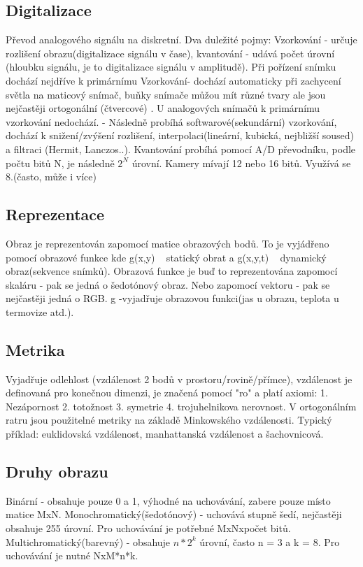 \subsection{Digitalizace}
Převod analogového signálu na diskretní. Dva duležité pojmy: Vzorkování - určuje rozlišení obrazu(digitalizace signálu v čase), kvantování
- udává počet úrovní (hloubku signálu, je to digitalizace signálu v amplitudě). Při pořízení snímku dochází nejdříve k primárnímu Vzorkování-
dochází automaticky při zachycení světla na maticový snímač, buňky snímače můžou mít různé tvary ale jsou nejčastěji ortogonální (čtvercové)
. U analogových snímačů k primárnímu vzorkování nedochází. - Následně probíhá softwarové(sekundární) vzorkování, dochází k snižení/zvýšení 
rozlišení, interpolaci(lineární, kubická, nejbližší soused) a filtraci (Hermit, Lanczos..). Kvantování probíhá pomocí A/D převodníku, podle 
počtu bitů N, je následně $2^N$ úrovní. Kamery mívají 12 nebo 16 bitů. Využívá se 8.(často, může i více)

\subsection{Reprezentace}
Obraz je reprezentován zapomocí matice obrazových bodů. To je vyjádřeno pomocí obrazové funkce kde g(x,y) ~ statický obrat a g(x,y,t) ~
dynamický obraz(sekvence snímků). Obrazová funkce je buď to reprezentována zapomocí skaláru - pak se jedná o šedotónový obraz. 
Nebo zapomocí vektoru - pak se nejčastěji jedná o RGB. g -vyjadřuje obrazovou funkci(jas u obrazu, teplota u termovize atd.). 
\subsection{Metrika}
Vyjadřuje odlehlost (vzdálenost 2 bodů v prostoru/rovině/přímce), vzdálenost je definovaná pro konečnou dimenzi, je značená pomocí "ro"
a platí axiomi:   1. Nezápornost 2. totožnost 3. symetrie 4. trojuhelnikova nerovnost. V ortogonálním ratru jsou použitelné metriky na základě
Minkowského vzdálenosti. Typický příklad: euklidovská vzdálenost, manhattanská vzdálenost a šachovnicová. 

\subsection{Druhy obrazu}
Binární - obsahuje pouze 0 a 1, výhodné na uchovávání, zabere pouze místo matice MxN.
Monochromatický(šedotónový) - uchovává stupně šedí, nejčastěji obsahuje 255 úrovní. Pro uchovávání je potřebné MxNxpočet bitů.
Multichromatický(barevný) - obsahuje $n*2^k$ úrovní, často n = 3 a k = 8. Pro uchovávání je nutné NxM*n*k.





